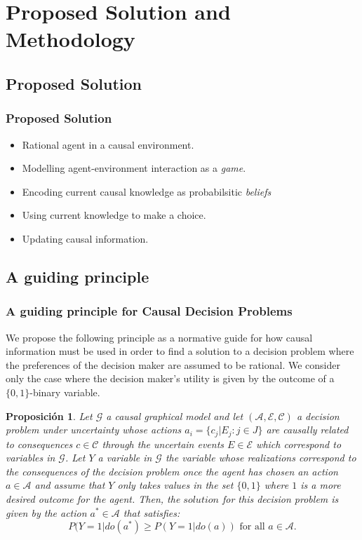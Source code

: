 \documentclass{beamer}
\theoremstyle{plain}
\newtheorem{prop}[teo]{Proposición}
\begin{document}
\section{Proposed Solution and Methodology}
\subsection{Proposed Solution}
\begin{frame}
\frametitle{Proposed Solution}
\begin{itemize}
\item Rational agent in a causal environment.
\item Modelling agent-environment interaction as a \textit{game}.
\item Encoding current causal knowledge as probabilsitic \textit{beliefs}
\item Using current knowledge to make a choice.
\item Updating causal information.
\end{itemize}
\end{frame}
\subsection{A guiding principle}
\begin{frame}
\frametitle{A guiding principle for Causal Decision Problems}
We propose the following principle as a normative guide for how causal information must be used in order to find a solution to a decision problem where the preferences of the decision maker are assumed to be rational. We consider only the case where the decision maker's utility is given by the outcome of a $\{0,1 \}$-binary variable.
\end{frame}
\begin{frame}
\begin{prop}
Let  $\mathcal{G}$ a causal graphical model and let $(\mathcal{A},\mathcal{E},\mathcal{C})$ a decision problem under uncertainty whose actions $a_i = \{ c_j | E_j : j \in J \}$  are causally related to consequences $c \in \mathcal{C}$ through the uncertain events $E \in \mathcal{E}$ which correspond to variables in $\mathcal{G}$. Let $Y$ a variable in $\mathcal{G}$ the variable whose realizations correspond to the consequences of the decision problem once the agent has chosen an action $a \in \mathcal{A}$ and assume that $Y$ only takes values in the set $\{ 0,1\}$ where $1$ is a more desired outcome for the agent. Then, the $\textit{solution}$ for this decision problem is given by the action $a^\ast \in \mathcal{A}$ that satisfies:
\[ P(Y=1 | do(a^\ast) \geq P(Y=1 | do(a)) \textrm{ for all } a \in \mathcal{A}. \]
\end{prop}
\end{frame}
\end{document}
